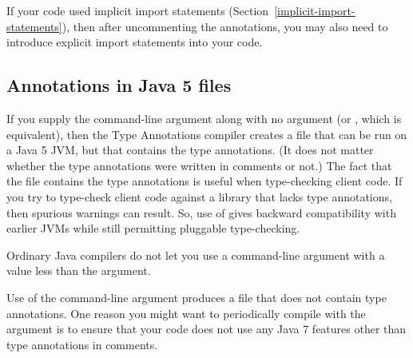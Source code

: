 If your code used implicit import statements
(Section~\ref{implicit-import-statements}), then after uncommenting the
annotations, you may also need to introduce
explicit import statements into your code.


\subsection{Annotations in Java 5  files\label{java5-class-files}}

If you supply the  command-line argument along with no
 argument (or , which is equivalent), then the
Type Annotations compiler creates a  file that can be run on a
Java 5 JVM, but that contains the type annotations.  (It does not matter
whether the type annotations were written in comments or not.)  The fact
that the  file contains the type annotations is useful when
type-checking client code.  If you try to type-check client code against a
library that lacks type annotations, then spurious warnings can result.
So, use of  gives backward compatibility with earlier JVMs
while still permitting pluggable type-checking.

Ordinary Java compilers do not let you use a  command-line
argument with a value less than the  argument.

Use of the  command-line argument produces a 
file that does not contain type annotations.  One reason you might want to
periodically compile with the  argument is to ensure that
your code does not use any Java 7 features other than type annotations in
comments.


